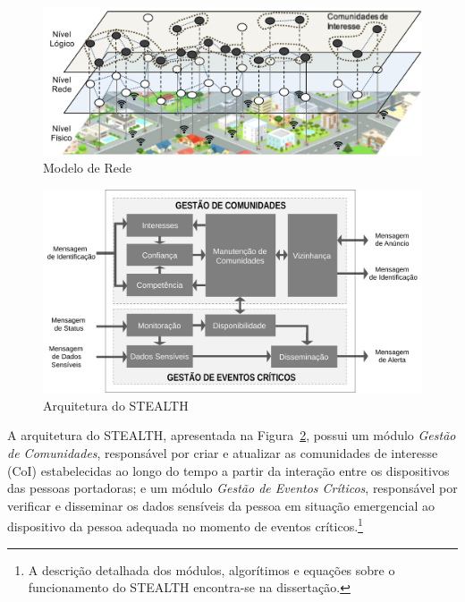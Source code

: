\documentclass[12pt]{article}
\newcommand{\as}[1]{\textcolor{blue}{{\bf #1}}}
\newcommand{\al}[1]{\textcolor{brown}{{\bf #1}}}
\begin{document}
\noindent
\begin{minipage}[b]{.48\linewidth}
\centering
\begin{figure}[H]
\centering
\includegraphics[width=1\textwidth]{figures/ModeloRede.pdf}
\caption{Modelo de Rede}
\label{fig:modeloRede}
\end{figure}
\end{minipage}
\begin{minipage}[b]{.52\linewidth}
\begin{figure}[H]
\centering
\includegraphics[width=1\textwidth]{figures/Arquitetura_8_p.pdf}
\caption{Arquitetura do STEALTH}
\label{fig:ArquiteturaStealth}
\end{figure}
\end{minipage}



A arquitetura do \mbox{STEALTH}, apresentada na Figura~\ref{fig:ArquiteturaStealth}, possui um módulo
{\it Gestão de Comunidades}, responsável por criar e atualizar as comunidades de interesse (CoI) estabelecidas ao longo do tempo a partir da interação entre os dispositivos das pessoas portadoras; e um módulo {\it Gestão de Eventos Críticos}, responsável por verificar e disseminar os dados sensíveis da pessoa em situação emergencial ao dispositivo da pessoa adequada no momento de eventos críticos.\footnote{A descrição detalhada dos módulos, algorítimos e equações sobre o funcionamento do \mbox{STEALTH} encontra-se na dissertação.}
\end{document}
